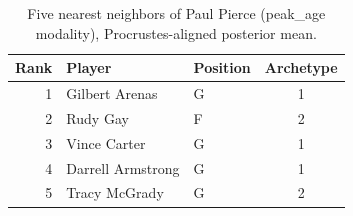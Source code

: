 \begin{table}[htbp]
  \centering\small
  \begin{tabular}{rllc}
    \toprule
    Rank & Player & Position & Archetype \\
    \midrule
    1 & Gilbert Arenas & G & 1 \\
    2 & Rudy Gay & F & 2 \\
    3 & Vince Carter & G & 1 \\
    4 & Darrell Armstrong & G & 1 \\
    5 & Tracy McGrady & G & 2 \\
    \bottomrule
  \end{tabular}
  \caption{Five nearest neighbors of Paul Pierce (peak_age modality), Procrustes-aligned posterior mean.}
  \label{tab:Paul_Pierce_neighbors_peak_age}
\end{table}

